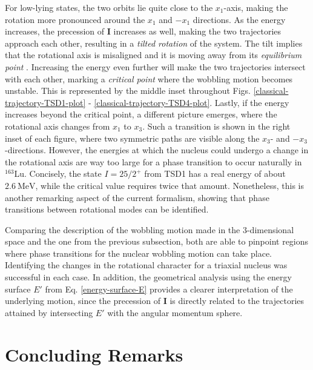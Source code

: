 For low-lying states, the two orbits lie quite close to the $x_1$-axis, making the rotation more pronounced around the $x_1$ and $-x_1$ directions. As the energy increases, the precession of $\mathbf{I}$ increases as well, making the two trajectories approach each other, resulting in a \emph{tilted rotation} of the system. The tilt implies that the rotational axis is misaligned and it is moving away from its \emph{equilibrium point} \cite{poenaru2021extensive2}. Increasing the energy even further will make the two trajectories intersect with each other, marking a \emph{critical point} where the wobbling motion becomes unstable. This is represented by the middle inset throughout Figs. \ref{classical-trajectory-TSD1-plot} - \ref{classical-trajectory-TSD4-plot}. Lastly, if the energy increases beyond the critical point, a different picture emerges, where the rotational axis changes from $x_1$ to $x_3$. Such a transition is shown in the right inset of each figure, where two symmetric paths are visible along the $x_3$- and $-x_3$-directions. However, the energies at which the nucleus could undergo a change in the rotational axis are way too large for a phase transition to occur naturally in $^{163}$Lu. Concisely, the state $I=25/2^+$ from TSD1 has a real energy of about $2.6\ \text{MeV}$, while the critical value requires twice that amount. Nonetheless, this is another remarking aspect of the current formalism, showing that phase transitions between rotational modes can be identified.

Comparing the description of the wobbling motion made in the 3-dimensional space and the one from the previous subsection, both are able to pinpoint regions where phase transitions for the nuclear wobbling motion can take place. Identifying the changes in the rotational character for a triaxial nucleus was successful in each case. In addition, the geometrical analysis using the energy surface $E'$ from Eq. \ref{energy-surface-E} provides a clearer interpretation of the underlying motion, since the precession of $\mathbf{I}$ is directly related to the trajectories attained by intersecting $E'$ with the angular momentum sphere.

\section{Concluding Remarks}
\label{chapter-5-concluding-remarks}

